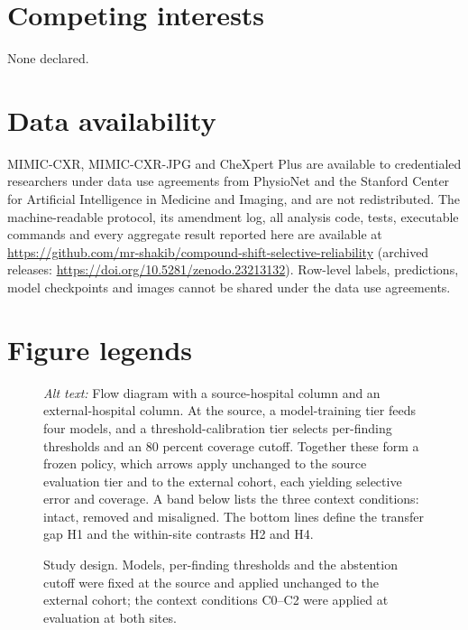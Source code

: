 \documentclass[12pt,a4paper]{article}
\newcommand{\alttext}[1]{\par\smallskip\noindent\textit{Alt text:} #1}
\begin{document}
\section*{Competing interests}
None declared.

\section*{Data availability}
MIMIC-CXR, MIMIC-CXR-JPG and CheXpert Plus are available to credentialed
researchers under data use agreements from PhysioNet and the Stanford Center
for Artificial Intelligence in Medicine and Imaging, and are not
redistributed.\cite{johnson2024cxrdata,johnson2024jpgdata,chambon2024} The
machine-readable protocol, its amendment log, all analysis code, tests,
executable commands and every aggregate result reported here are available at
\url{https://github.com/mr-shakib/compound-shift-selective-reliability}
(archived releases: \url{https://doi.org/10.5281/zenodo.23213132}).\cite{howlader2026zenodo} Row-level labels,
predictions, model checkpoints and images cannot be shared under the data use
agreements.


{\raggedright}

\clearpage
\section*{Figure legends}

\begin{figure}[H]
\caption{Study design. Models, per-finding thresholds and the abstention cutoff
were fixed at the source and applied unchanged to the external cohort; the
context conditions C0--C2 were applied at evaluation at both sites.}
\label{fig:design}
\alttext{Flow diagram with a source-hospital column and an external-hospital
column. At the source, a model-training tier feeds four models, and a
threshold-calibration tier selects per-finding thresholds and an 80 percent
coverage cutoff. Together these form a frozen policy, which arrows apply
unchanged to the source evaluation tier and to the external cohort, each
yielding selective error and coverage. A band below lists the three context
conditions: intact, removed and misaligned. The bottom lines define the
transfer gap H1 and the within-site contrasts H2 and H4.}
\end{figure}
\end{document}

